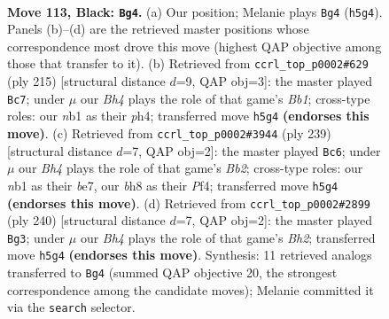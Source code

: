 \documentclass[11pt]{article}
\begin{document}
\clearpage

\begin{figure}[p]\centering
\begin{subfigure}{0.46\textwidth}\centering
\resizebox{\linewidth}{!}{%
\newchessgame
\chessboard[
  setfen={7B/5k2/8/7b/p1p5/8/5K2/1N6 b - - 81 113},
  showmover=false,
  pgfstyle=straightmove, color=movearrow, markmove={h5-g4}
]}
\caption{}
\end{subfigure}\hfill
\begin{subfigure}{0.46\textwidth}\centering
\resizebox{\linewidth}{!}{%
\newchessgame
\chessboard[
  setfen={1b6/1P1B4/8/4k2p/7P/5K2/8/8 b - - 4 108},
  showmover=false,
  pgfstyle=straightmove, color=movearrow, markmove={b8-c7}
]}
\caption{}
\end{subfigure}
\\[4pt]
\begin{subfigure}{0.46\textwidth}\centering
\resizebox{\linewidth}{!}{%
\newchessgame
\chessboard[
  setfen={8/1b2B3/8/7p/4kp2/8/8/6K1 b - - 87 120},
  showmover=false,
  pgfstyle=straightmove, color=movearrow, markmove={b7-c6}
]}
\caption{}
\end{subfigure}\hfill
\begin{subfigure}{0.46\textwidth}\centering
\resizebox{\linewidth}{!}{%
\newchessgame
\chessboard[
  setfen={2k5/6P1/3P4/4K3/8/1b6/7B/8 w - - 25 121},
  showmover=false,
  pgfstyle=straightmove, color=movearrow, markmove={h2-g3}
]}
\caption{}
\end{subfigure}
\caption{\textbf{Move 113, Black: \texttt{Bg4}.} (a) Our position; Melanie plays \texttt{Bg4} (\texttt{h5g4}). Panels (b)--(d) are the retrieved master positions whose correspondence most drove this move (highest QAP objective among those that transfer to it). (b) Retrieved from \texttt{ccrl\_top\_p0002\#629} (ply 215) [structural distance $d$=9, QAP obj=3]: the master played \texttt{Bc7}; under $\mu$ our \emph{Bh4} plays the role of that game's \emph{Bb1}; cross-type roles: our \emph{n}b1 as their \emph{p}h4; transferred move \texttt{h5g4} \textbf{(endorses this move)}. (c) Retrieved from \texttt{ccrl\_top\_p0002\#3944} (ply 239) [structural distance $d$=7, QAP obj=2]: the master played \texttt{Bc6}; under $\mu$ our \emph{Bh4} plays the role of that game's \emph{Bb2}; cross-type roles: our \emph{n}b1 as their \emph{b}e7, our \emph{b}h8 as their \emph{P}f4; transferred move \texttt{h5g4} \textbf{(endorses this move)}. (d) Retrieved from \texttt{ccrl\_top\_p0002\#2899} (ply 240) [structural distance $d$=7, QAP obj=2]: the master played \texttt{Bg3}; under $\mu$ our \emph{Bh4} plays the role of that game's \emph{Bh2}; transferred move \texttt{h5g4} \textbf{(endorses this move)}. Synthesis: 11 retrieved analogs transferred to \texttt{Bg4} (summed QAP objective 20, the strongest correspondence among the candidate moves); Melanie committed it via the \texttt{search} selector.}
\label{fig:thought-m225}
\end{figure}
\end{document}
